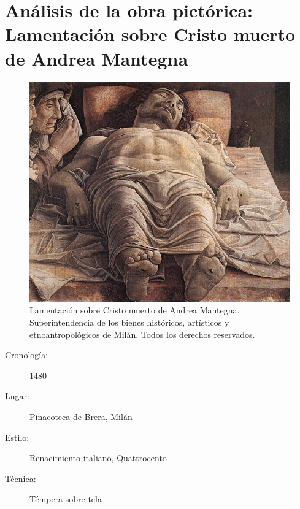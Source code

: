 \section{Análisis de la obra pictórica: Lamentación sobre Cristo muerto de Andrea Mantegna}

\begin{figure}[ht!]
	\includegraphics[width=\textwidth]{mantegna.jpg}
	\caption{Lamentación sobre Cristo muerto de Andrea Mantegna. Superintendencia de los bienes históricos, artísticos y etnoantropológicos de Milán. Todos los derechos reservados.} %
\end{figure}

\newpage

\begin{description}
\item[Cronología:] 1480
\item[Lugar:] Pinacoteca de Brera, Milán
\item[Estilo:] Renacimiento italiano, Quattrocento
\item[Técnica:] Témpera sobre tela
\end{description}

